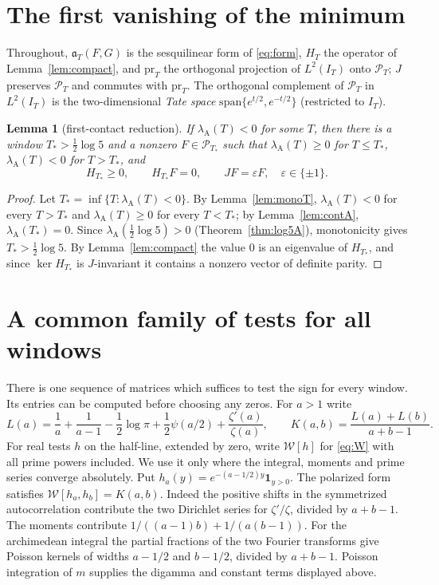 \documentclass[11pt]{amsart}
\newtheorem{lemma}[theorem]{Lemma}
\theoremstyle{definition}
\theoremstyle{remark}
\newcommand{\PT}{\mathcal P_T}
\newcommand{\IT}{I_T}
\newcommand{\lamA}{\lambda_{\mathrm A}(T)}
\begin{document}
\section{The first vanishing of the minimum}
Throughout, $\mathfrak a_T(F,G)$ is the sesquilinear form of \eqref{eq:form}, $H_T$ the operator of
Lemma~\ref{lem:compact}, and $\mathrm{pr}_T$ the orthogonal projection of $L^2(\IT)$ onto $\PT$; $J$ preserves
$\PT$ and commutes with $\mathrm{pr}_T$. The orthogonal complement of $\PT$ in $L^2(\IT)$ is the
two-dimensional \emph{Tate space} $\mathrm{span}\{e^{t/2},e^{-t/2}\}$ (restricted to $\IT$).

\begin{lemma}[first-contact reduction]\label{lem:firstcontact}
If $\lamA<0$ for some $T$, then there is a window $T_*>\frac12\log5$ and a nonzero $F\in\mathcal P_{T_*}$ such
that $\lambda_{\mathrm A}(T)\ge0$ for $T\le T_*$, $\lambda_{\mathrm A}(T)<0$ for $T>T_*$, and
\[
 H_{T_*}\ge0,\qquad H_{T_*}F=0,\qquad JF=\varepsilon F,\quad \varepsilon\in\{\pm1\}.
\]
\end{lemma}
\begin{proof}
Let $T_*=\inf\{T:\lamA<0\}$. By Lemma~\ref{lem:monoT}, $\lamA<0$ for every $T>T_*$ and $\lamA\ge0$ for every
$T<T_*$; by Lemma~\ref{lem:contA}, $\lambda_{\mathrm A}(T_*)=0$. Since $\lambda_{\mathrm A}(\frac12\log5)>0$
(Theorem~\ref{thm:log5A}), monotonicity gives $T_*>\frac12\log5$. By Lemma~\ref{lem:compact} the value $0$ is
an eigenvalue of $H_{T_*}$, and since $\ker H_{T_*}$ is $J$-invariant it contains a nonzero vector of
definite parity.
\end{proof}
\section{A common family of tests for all windows}
There is one sequence of matrices which suffices to test the sign for every
window. Its entries can be computed before choosing any zeros. For $a>1$
write
\[
 L(a)=\frac1a+\frac1{a-1}-\frac12\log\pi+
 \frac12\psi(a/2)+\frac{\zeta'(a)}{\zeta(a)},\qquad
 K(a,b)=\frac{L(a)+L(b)}{a+b-1}.
\]
For real tests $h$ on the half-line, extended by zero, write $\mathcal W[h]$
for \eqref{eq:W} with all prime powers included. We use it only where
the integral, moments and prime series converge absolutely. Put
$h_a(y)=e^{-(a-1/2)y}\mathbf1_{y>0}$. The polarized form satisfies
$\mathcal W[h_a,h_b]=K(a,b)$. Indeed the positive shifts
in the symmetrized autocorrelation contribute the two Dirichlet series for
$\zeta'/\zeta$, divided by $a+b-1$. The moments contribute
$1/((a-1)b)+1/(a(b-1))$. For the archimedean integral the partial fractions
of the two Fourier transforms give Poisson kernels of widths $a-1/2$ and
$b-1/2$, divided by $a+b-1$. Poisson integration of $m$ supplies the
digamma and constant terms displayed above.
\end{document}
